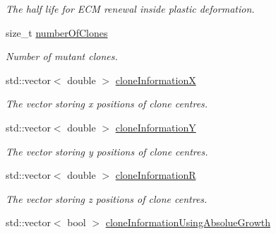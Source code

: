 \begin{DoxyCompactItemize}
\begin{DoxyCompactList}\small\item\em The half life for E\+C\+M renewal inside plastic deformation. \end{DoxyCompactList}\item 
\hypertarget{classSimulation_aa935cd88fb6b87363b775efa578f2737}{}size\+\_\+t \hyperlink{classSimulation_aa935cd88fb6b87363b775efa578f2737}{number\+Of\+Clones}\label{classSimulation_aa935cd88fb6b87363b775efa578f2737}

\begin{DoxyCompactList}\small\item\em Number of mutant clones. \end{DoxyCompactList}\item 
\hypertarget{classSimulation_af80702141bab1e092d1fb9f464a4c91c}{}std\+::vector$<$ double $>$ \hyperlink{classSimulation_af80702141bab1e092d1fb9f464a4c91c}{clone\+Information\+X}\label{classSimulation_af80702141bab1e092d1fb9f464a4c91c}

\begin{DoxyCompactList}\small\item\em The vector storing x positions of clone centres. \end{DoxyCompactList}\item 
\hypertarget{classSimulation_afbd330f29895998ed507bcd07792378e}{}std\+::vector$<$ double $>$ \hyperlink{classSimulation_afbd330f29895998ed507bcd07792378e}{clone\+Information\+Y}\label{classSimulation_afbd330f29895998ed507bcd07792378e}

\begin{DoxyCompactList}\small\item\em The vector storing y positions of clone centres. \end{DoxyCompactList}\item 
\hypertarget{classSimulation_a13db8ef58a0e1927a397a7d562d6812a}{}std\+::vector$<$ double $>$ \hyperlink{classSimulation_a13db8ef58a0e1927a397a7d562d6812a}{clone\+Information\+R}\label{classSimulation_a13db8ef58a0e1927a397a7d562d6812a}

\begin{DoxyCompactList}\small\item\em The vector storing z positions of clone centres. \end{DoxyCompactList}\item 
\hypertarget{classSimulation_af00718ca118c533bbe7059a0f87cad3e}{}std\+::vector$<$ bool $>$ \hyperlink{classSimulation_af00718ca118c533bbe7059a0f87cad3e}{clone\+Information\+Using\+Absolue\+Growth}\label{classSimulation_af00718ca118c533bbe7059a0f87cad3e}


\end{DoxyCompactItemize}
